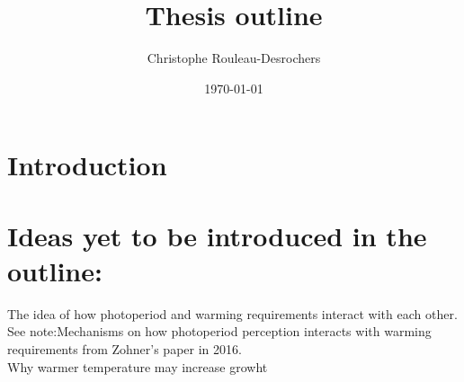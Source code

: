 \documentclass{article}
\title{Thesis outline}
\date{\today}
\author{Christophe Rouleau-Desrochers}
\begin{document}

\maketitle
\section*{Introduction}


\section *{Ideas yet to be introduced in the outline:}
The idea of how photoperiod and warming requirements interact with each other. See note:Mechanisms on how photoperiod perception interacts with warming requirements from Zohner's paper in 2016.\\
Why warmer temperature may increase growht
\end{document}
